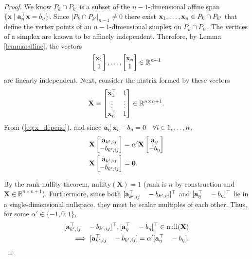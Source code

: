 \begin{proof}
We know $P_k \cap P_{k'}$ is a subset of the $n-1$-dimensional affine span $\{\mathbf{x} \mid \mathbf{a}_\eta^\top \mathbf{x} = b_\eta \}$. Since $\vert P_k \cap P_{k'} \vert_{n-1} \neq 0$ there exist $\mathbf{x}_1, \ldots, \mathbf{x}_{n} \in P_k \cap P_{k'}$ that define the vertex points of an $n-1$-dimensional simplex on $P_k \cap P_{k'}$. The vertices of a simplex are known to be affinely independent. Therefore, by Lemma \ref{lemma:affine}, the vectors
\begin{align}
    \begin{bmatrix} \mathbf{x}_1 \\ 1 \end{bmatrix}, \ldots, \begin{bmatrix} \mathbf{x}_{n} \\ 1 \end{bmatrix} \in \mathbb{R}^{n+1}
\end{align}
are linearly independent. Next, consider the matrix formed by these vectors
\begin{align}
    \mathbf{X} = \begin{bmatrix} \mathbf{x}_1^\top & 1 \\ \vdots & \vdots \\ \mathbf{x}_{n}^\top & 1 \end{bmatrix} \in \mathbb{R}^{n \times n+1}.
\end{align}
From (\ref{eq:x_depend}), and since $\mathbf{a}_\eta^\top \mathbf{x}_i - b_\eta = 0 \quad \forall i \in 1,\ldots,n$,
\begin{subequations}
\begin{align}
    \mathbf{X} \begin{bmatrix} \mathbf{a}_{k',ij} \\ -b_{k',ij} \end{bmatrix}  &= \alpha' \mathbf{X}  \begin{bmatrix} \mathbf{a}_\eta \\ -b_\eta \end{bmatrix}\\
    \mathbf{X} \begin{bmatrix} \mathbf{a}_{k',ij} \\ -b_{k',ij} \end{bmatrix} &= \mathbf{0}.
\end{align}
\end{subequations}

By the rank-nullity theorem, nullity$(\mathbf{X}) = 1$ (rank is $n$ by construction and $\mathbf{X} \in \mathbb{R}^{n \times n+1}$). Furthermore, since both $[\mathbf{a}_{k',ij}^\top \quad -b_{k',ij}]^\top$ and $[\mathbf{a}_\eta^\top \quad -b_\eta]^\top$ lie in a single-dimensional nullspace, they must be scalar multiples of each other.
Thus, for some $\alpha' \in \{-1,0,1\}$,
\begin{subequations}
    \begin{align}
    [\mathbf{a}_{k',ij}^\top \quad -b_{k',ij}]^\top, [\mathbf{a}_\eta^\top \quad -b_\eta]^\top \in \text{null}(\mathbf{X}) \\
    \implies [\mathbf{a}_{k',ij}^\top\quad  -b_{k',ij}] = \alpha'[\mathbf{a}_\eta^\top\quad -b_\eta].
\end{align}
\end{subequations}


\end{proof}
